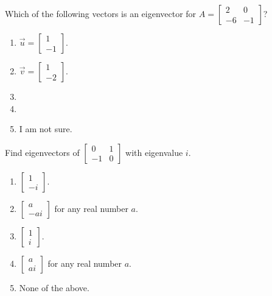 \documentclass[t, 14pt]{beamer}
\begin{document}
\begin{frame}
  Which of the following vectors is an eigenvector for \(A = \begin{bmatrix} 2 & 0 \\ -6 & -1 \end{bmatrix}\)?

  \bigskip
  \begin{multicols}{2}
    \begin{enumerate}
      \item \(\vec{u} = \begin{bmatrix} 1 \\ -1 \end{bmatrix}\).
      \item \(\vec{v} = \begin{bmatrix} 1 \\ -2 \end{bmatrix}\).
      \item 
      \item 
      \item I am not sure. 
    \end{enumerate}
  \end{multicols}
\end{frame}

\begin{frame}
  Find eigenvectors of \(\begin{bmatrix} 0 & 1 \\ -1 & 0 \end{bmatrix}\) with eigenvalue \(i\).

  \begin{multicols}{2}
    \begin{enumerate}
      \item \(\begin{bmatrix} 1 \\  -i\end{bmatrix}\).
      \item \(\begin{bmatrix} a \\ -ai\end{bmatrix}\) for any real number \(a\).
      \item \(\begin{bmatrix} 1 \\   i\end{bmatrix}\).
      \item \(\begin{bmatrix} a \\  ai\end{bmatrix}\) for any real number \(a\).
      \item None of the above.
    \end{enumerate}
  \end{multicols}
\end{frame}
\end{document}
